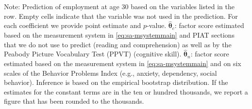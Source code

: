 \documentclass[static]{JJH-Beamer}
\begin{document}
\begin{frame}
\begin{table}[H]
\begin{center}
{\begin{tabular}{lcccccccc}
\bottomrule
\end{tabular}
}
\end{center}
\tiny \flushleft
Note: Prediction of employment at age 30 based on the variables listed in the row. Empty cells indicate that the variable was not used in the prediction. For each coefficient we provide point estimate and $p$-value. $\hat{\bm{\theta}}_{c}$: factor score estimated based on the measurement system in \eqref{eq:sa-msystemmain} and PIAT sections that we do not use to predict (reading and comprehension) as well as by the Peabody Picture Vocabulary Test (PPVT) (cognitive skill). $\hat{\bm{\theta}}_{n}$: factor score estimated based on the measurement system in \eqref{eq:sa-msystemmain} and on six scales of the Behavior Problems Index (e.g., anxiety, dependency, social behavior). Inference is based on the empirical bootstrap distribution. If the estimates for the constant terms are in the ten or hundred thousands, we report a figure that has been rounded to the thousands.\\
\end{table}

\end{frame}
\end{document}
